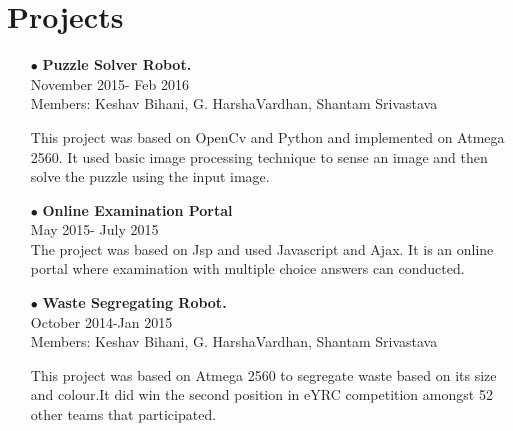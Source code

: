 \documentclass[12pt]{article}
\begin{document}
\section*{Projects}
\begin{itemize}
\item[$\bullet$]\textbf{Puzzle Solver Robot.}\\November 2015- Feb 2016\\Members: Keshav Bihani, G. HarshaVardhan, Shantam Srivastava

This project was based on OpenCv and Python and implemented on Atmega 2560. It used basic image processing technique to sense an image and then solve the puzzle using the input image.
\item[$\bullet$]\textbf{Online Examination Portal}\\May 2015- July 2015\\
The project was based on Jsp and used Javascript and Ajax. It is an online portal where examination with multiple choice answers can conducted.  
\item[$\bullet$]\textbf{Waste Segregating Robot.}\\October 2014-Jan 2015 \\Members: Keshav Bihani, G. HarshaVardhan, Shantam Srivastava

This project was based on Atmega 2560 to segregate waste based on its size and colour.It did win the second position in eYRC competition amongst 52 other teams that participated.
\end{itemize}
\end{document}
